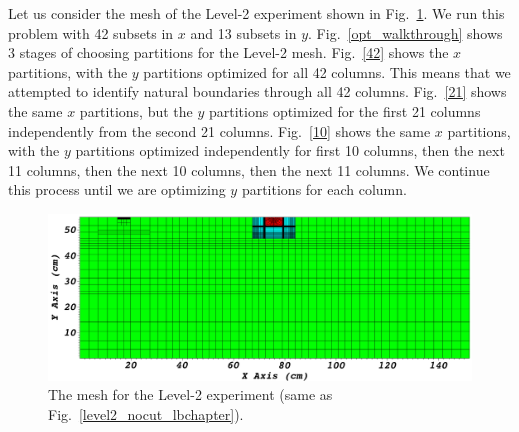 \documentclass[times,final]{elsarticle}
\begin{document}
Let us consider the mesh of the Level-2 experiment shown in Fig.~\ref{level2_nocut}.
We run this problem with 42 subsets in $x$ and 13 subsets in $y$.
Fig.~\ref{opt_walkthrough} shows 3 stages of choosing partitions for the Level-2 mesh.
Fig.~\ref{42} shows the $x$ partitions, with the $y$ partitions optimized for all 42 columns.
This means that we attempted to identify natural boundaries through all 42 columns.
Fig.~\ref{21} shows the same $x$ partitions, but the $y$ partitions optimized for the first 21 columns independently from the second 21 columns.
Fig.~\ref{10} shows the same $x$ partitions, with the $y$ partitions optimized independently for first 10 columns, then the next 11 columns, then the next 10 columns, then the next 11 columns.
We continue this process until we are optimizing $y$ partitions for each column.
\begin{figure}[h]
\centering
\includegraphics[scale=0.25]{../figures/level2_nocut.png}
\caption{The mesh for the Level-2 experiment (same as Fig.~\ref{level2_nocut_lbchapter}).}
\label{level2_nocut}
\end{figure}
\end{document}
